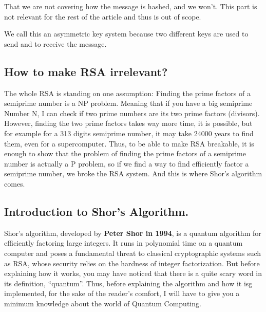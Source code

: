 \begin{notebox}
That we are not covering how the message is hashed, and we won’t. This part is not relevant for the rest of the article and thus is out of scope.
\end{notebox}

\begin{notebox}
    We call this an asymmetric key system because two different keys are used to send and to receive the message.
\end{notebox}

\subsection{How to make RSA irrelevant?}
The whole RSA is standing on one assumption: Finding the prime factors of a semiprime number is a NP problem. Meaning that if you have a big semiprime Number N, I can check if two prime numbers are its two prime factors (divisors). However, finding the two prime factors takes way more time, it is possible, but for example for a 313 digits semiprime number, it may take 24000 years to find them, even for a supercomputer. Thus, to be able to make RSA breakable, it is enough to show that the problem of finding the prime factors of a semiprime number is actually a P problem, so if we find a way to find efficiently factor a semiprime number, we broke the RSA system.\nl
And this is where Shor’s algorithm comes.


\subsection{Introduction to Shor's Algorithm.}
Shor’s algorithm, developed by \textbf{Peter Shor in 1994}, is a quantum algorithm for efficiently factoring large integers. It runs in polynomial time on a quantum computer and poses a fundamental threat to classical cryptographic systems such as RSA, whose security relies on the hardness of integer factorization.\nl
But before explaining how it works, you may have noticed that there is a quite scary word in its definition, “quantum”. Thus, before explaining the algorithm and how it isg implemented, for the sake of the reader’s comfort, I will have to give you a minimum knowledge about the world of Quantum Computing.

